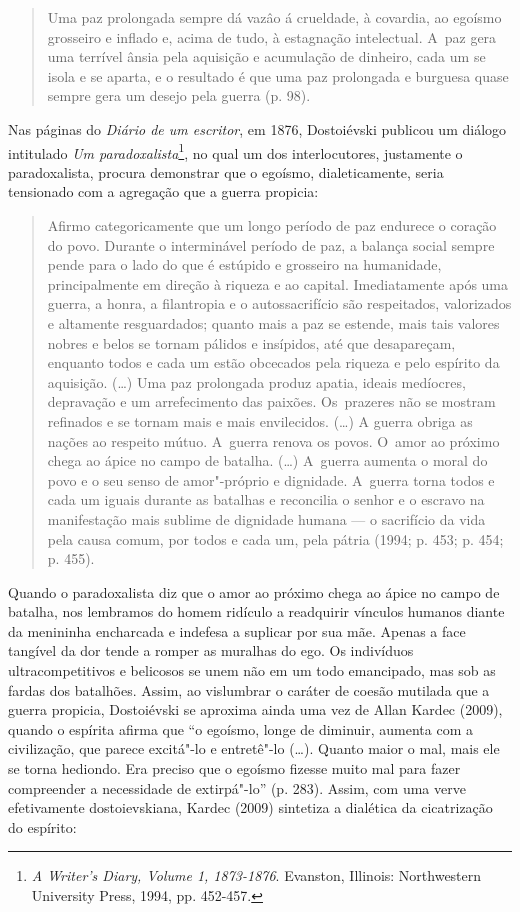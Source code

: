 \begin{quote}
Uma paz prolongada sempre dá vazâo á crueldade, à covardia, ao egoísmo
grosseiro e inflado e, acima de tudo, à estagnação intelectual. A~paz
gera uma terrível ânsia pela aquisição e acumulação de dinheiro, cada um
se isola e se aparta, e o resultado é que uma paz prolongada e burguesa
quase sempre gera um desejo pela guerra (p. 98).
\end{quote}

Nas páginas do \emph{Diário de um escritor}, em 1876, Dostoiévski
publicou um diálogo intitulado \emph{Um paradoxalista}\footnote{\emph{A
  Writer's Diary, Volume 1, 1873-1876}. Evanston, Illinois: Northwestern
  University Press, 1994, pp. 452-457.}, no qual um dos interlocutores,
justamente o paradoxalista, procura demonstrar que o egoísmo,
dialeticamente, seria tensionado com a agregação que a guerra propicia:

\begin{quote}
Afirmo categoricamente que um longo período de paz endurece o coração do
povo. Durante o interminável período de paz, a balança social sempre
pende para o lado do que é estúpido e grosseiro na humanidade,
principalmente em direção à riqueza e ao capital. Imediatamente após uma
guerra, a honra, a filantropia e o autossacrifício são respeitados,
valorizados e altamente resguardados; quanto mais a paz se estende, mais
tais valores nobres e belos se tornam pálidos e insípidos, até que
desapareçam, enquanto todos e cada um estão obcecados pela riqueza e
pelo espírito da aquisição. (\ldots{}) Uma paz prolongada produz apatia,
ideais medíocres, depravação e um arrefecimento das paixões. Os~prazeres
não se mostram refinados e se tornam mais e mais envilecidos. (\ldots{})
A guerra obriga as nações ao respeito mútuo. A~guerra renova os povos. O~amor
ao próximo chega ao ápice no campo de batalha. (\ldots{}) A~guerra
aumenta o moral do povo e o seu senso de amor"-próprio e dignidade. A~guerra
torna todos e cada um iguais durante as batalhas e reconcilia o
senhor e o escravo na manifestação mais sublime de dignidade humana --- o
sacrifício da vida pela causa comum, por todos e cada um, pela pátria
(1994; p. 453; p. 454; p. 455).
\end{quote}

Quando o paradoxalista diz que o amor ao próximo chega ao ápice no campo
de batalha, nos lembramos do homem ridículo a readquirir vínculos
humanos diante da menininha encharcada e indefesa a suplicar por sua
mãe. Apenas a face tangível da dor tende a romper as muralhas do ego. Os
indivíduos ultracompetitivos e belicosos se unem não em um todo
emancipado, mas sob as fardas dos batalhões. Assim, ao vislumbrar o
caráter de coesão mutilada que a guerra propicia, Dostoiévski se
aproxima ainda uma vez de Allan Kardec (2009), quando o espírita afirma
que ``o egoísmo, longe de diminuir, aumenta com a civilização, que
parece excitá"-lo e entretê"-lo (\ldots{}). Quanto maior o mal, mais ele
se torna hediondo. Era preciso que o egoísmo fizesse muito mal para
fazer compreender a necessidade de extirpá"-lo'' (p. 283). Assim, com uma
verve efetivamente dostoievskiana, Kardec (2009) sintetiza a dialética
da cicatrização do espírito:

